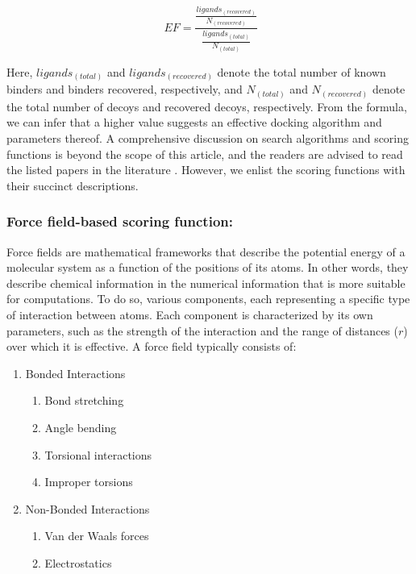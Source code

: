 \begin{equation} 
  \label{eq:EF-recover}
   \ EF = \frac{\frac{ligands_{(recovered)}}{N_{(recovered)}}}{\frac{ligands_{(total)}}{N_{(total)}}} 
\end{equation}

Here, $ligands_{(total)}$ and $ligands_{(recovered)}$ denote the total number of known binders and binders recovered, respectively, and $N_{(total)}$ and $N_{(recovered)}$ denote the total number of decoys and recovered decoys, respectively. From the formula, we can infer that a higher value suggests an effective docking algorithm and parameters thereof. A comprehensive discussion on search algorithms and scoring functions is beyond the scope of this article, and the readers are advised to read the listed papers in the literature \cite{bib5, bib6}. However, we enlist the scoring functions with their succinct descriptions. 

\subsubsection*{Force field-based scoring function:}

Force fields\cite{bib28} are mathematical frameworks that describe the potential energy of a molecular system as a function of the positions of its atoms. In other words, they describe chemical information in the numerical information that is more suitable for computations. To do so, various components, each representing a specific type of interaction between atoms. Each component is characterized by its own parameters, such as the strength of the interaction and the range of distances ($r$) over which it is effective.
A force field typically consists of:
\begin{enumerate}
    \item Bonded Interactions
        \begin{enumerate}
	       \item Bond stretching
	       \item Angle bending
	       \item Torsional interactions
	       \item Improper torsions
        \end{enumerate}
    \item Non-Bonded Interactions
        \begin{enumerate}
	       \item Van der Waals forces
	       \item Electrostatics
        \end{enumerate}
\end{enumerate}

